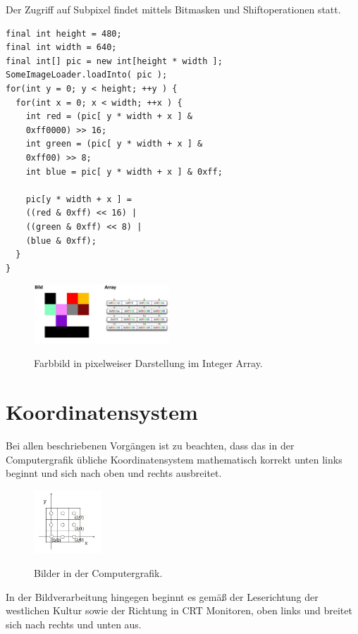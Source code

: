 Der Zugriff auf Subpixel findet mittels Bitmasken und Shiftoperationen statt.

\begin{lstlisting}[caption=Farbbild Pixelweise als Integer]
final int height = 480;
final int width = 640;
final int[] pic = new int[height * width ];
SomeImageLoader.loadInto( pic );
for(int y = 0; y < height; ++y ) {
  for(int x = 0; x < width; ++x ) {
    int red = (pic[ y * width + x ] &
    0xff0000) >> 16;
    int green = (pic[ y * width + x ] &
    0xff00) >> 8;
    int blue = pic[ y * width + x ] & 0xff;

    pic[y * width + x ] = 
    ((red & 0xff) << 16) | 
    ((green & 0xff) << 8) | 
    (blue & 0xff);
  }
}
\end{lstlisting}

\begin{figure}[ht]
  \centering
  \includegraphics[width=2.0in]{images/BildPixelweiseInteger}
  \caption{Farbbild in pixelweiser Darstellung im Integer Array.}
  \label{fig:Pixelweise Darstellung im Array.}
  \cite{rehfeld}
\end{figure}


\section{Koordinatensystem}
Bei allen beschriebenen Vorgängen ist zu beachten, dass das in der Computergrafik übliche Koordinatensystem mathematisch korrekt unten links beginnt und sich nach oben und rechts ausbreitet.

\begin{figure}[ht]
  \centering
  \includegraphics[width=1.0in]{images/koordinatenSystemComputergrafik}
  \caption{Bilder in der Computergrafik.}
  \label{fig:Koordinatenursprung unten links}
  \cite{rehfeld}
\end{figure}

In der Bildverarbeitung hingegen beginnt es gemäß der Leserichtung der westlichen Kultur sowie der Richtung in CRT Monitoren, oben links und breitet sich nach rechts und unten aus.
 
